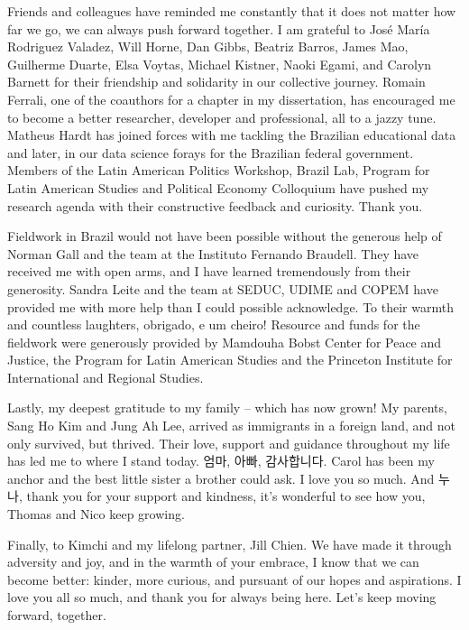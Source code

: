 \documentclass[12pt]{report}
\theoremstyle{definition}
\begin{document}
Friends and colleagues have reminded me constantly that it does not matter how far we go, we can always push forward together. I am grateful to Jos\'{e} Mar\'{i}a Rodriguez Valadez, Will Horne, Dan Gibbs, Beatriz Barros, James Mao, Guilherme Duarte, Elsa Voytas, Michael Kistner, Naoki Egami, and Carolyn Barnett for their friendship and solidarity in our collective journey. Romain Ferrali, one of the coauthors for a chapter in my dissertation, has encouraged me to become a better researcher, developer and professional, all to a jazzy tune. Matheus Hardt has joined forces with me tackling the Brazilian educational data and later, in our data science forays for the Brazilian federal government. Members of the Latin American Politics Workshop, Brazil Lab, Program for Latin American Studies and Political Economy Colloquium have pushed my research agenda with their constructive feedback and curiosity. Thank you.

Fieldwork in Brazil would not have been possible without the generous help of Norman Gall and the team at the Instituto Fernando Braudell. They have received me with open arms, and I have learned tremendously from their generosity. Sandra Leite and the team at SEDUC, UDIME and COPEM have provided me with more help than I could possible acknowledge. To their warmth and countless laughters, obrigado, e um cheiro! Resource and funds for the fieldwork were generously provided by Mamdouha Bobst Center for Peace and Justice, the Program for Latin American Studies and the Princeton Institute for International and Regional Studies.

Lastly, my deepest gratitude to my family -- which has now grown! My parents, Sang Ho Kim and Jung Ah Lee, arrived as immigrants in a foreign land, and not only survived, but thrived. Their love, support and guidance throughout my life has led me to where I stand today. 엄마, 아빠, 감사합니다. Carol has been my anchor and the best little sister a brother could ask. I love you so much. And 누나, thank you for your support and kindness, it's wonderful to see how you, Thomas and Nico keep growing.

Finally, to Kimchi and my lifelong partner, Jill Chien. We have made it through adversity and joy, and in the warmth of your embrace, I know that we can become better: kinder, more curious, and pursuant of our hopes and aspirations. I love you all so much, and thank you for always being here. Let's keep moving forward, together.

\newpage

\tableofcontents
\end{document}
